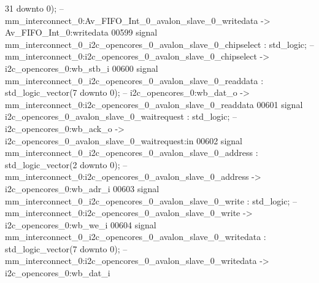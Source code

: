 \begin{DoxyCode}
{      31} \textcolor{keywordflow}{downto} \textcolor{vhdllogic}{}\textcolor{vhdllogic}{0}\textcolor{vhdlchar}{)};\textcolor{keyword}{ -- mm\_interconnect\_0:Av\_FIFO\_Int\_0\_avalon\_slave\_0\_writedata -> Av\_FIFO\_Int\_0:writedata}
00599     \textcolor{keywordflow}{signal} \textcolor{vhdlchar}{mm_interconnect_0_i2c_opencores_0_avalon_slave_0_chipselect}                 \textcolor{vhdlchar}{:} \textcolor{comment}{std\_logic};\textcolor{keyword}{        
                   -- mm\_interconnect\_0:i2c\_opencores\_0\_avalon\_slave\_0\_chipselect -> i2c\_opencores\_0:wb\_stb\_i}
00600     \textcolor{keywordflow}{signal} \textcolor{vhdlchar}{mm_interconnect_0_i2c_opencores_0_avalon_slave_0_readdata}                   \textcolor{vhdlchar}{:} \textcolor{comment}{std\_logic\_vector}\textcolor{vhdlchar}{(}\textcolor{vhdllogic}{}\textcolor{vhdllogic}{7}
       \textcolor{keywordflow}{downto} \textcolor{vhdllogic}{}\textcolor{vhdllogic}{0}\textcolor{vhdlchar}{)};\textcolor{keyword}{  -- i2c\_opencores\_0:wb\_dat\_o -> mm\_interconnect\_0:i2c\_opencores\_0\_avalon\_slave\_0\_readdata}
00601     \textcolor{keywordflow}{signal} \textcolor{vhdlchar}{i2c_opencores_0_avalon_slave_0_waitrequest}                                  \textcolor{vhdlchar}{:} \textcolor{comment}{std\_logic};\textcolor{keyword}{        
                   -- i2c\_opencores\_0:wb\_ack\_o -> i2c\_opencores\_0\_avalon\_slave\_0\_waitrequest:in}
00602     \textcolor{keywordflow}{signal} \textcolor{vhdlchar}{mm_interconnect_0_i2c_opencores_0_avalon_slave_0_address}                    \textcolor{vhdlchar}{:} \textcolor{comment}{std\_logic\_vector}\textcolor{vhdlchar}{(}\textcolor{vhdllogic}{}\textcolor{vhdllogic}{2}
       \textcolor{keywordflow}{downto} \textcolor{vhdllogic}{}\textcolor{vhdllogic}{0}\textcolor{vhdlchar}{)};\textcolor{keyword}{  -- mm\_interconnect\_0:i2c\_opencores\_0\_avalon\_slave\_0\_address -> i2c\_opencores\_0:wb\_adr\_i}
00603     \textcolor{keywordflow}{signal} \textcolor{vhdlchar}{mm_interconnect_0_i2c_opencores_0_avalon_slave_0_write}                      \textcolor{vhdlchar}{:} \textcolor{comment}{std\_logic};\textcolor{keyword}{        
                   -- mm\_interconnect\_0:i2c\_opencores\_0\_avalon\_slave\_0\_write -> i2c\_opencores\_0:wb\_we\_i}
00604     \textcolor{keywordflow}{signal} \textcolor{vhdlchar}{mm_interconnect_0_i2c_opencores_0_avalon_slave_0_writedata}                  \textcolor{vhdlchar}{:} \textcolor{comment}{std\_logic\_vector}\textcolor{vhdlchar}{(}\textcolor{vhdllogic}{}\textcolor{vhdllogic}{7}
       \textcolor{keywordflow}{downto} \textcolor{vhdllogic}{}\textcolor{vhdllogic}{0}\textcolor{vhdlchar}{)};\textcolor{keyword}{  -- mm\_interconnect\_0:i2c\_opencores\_0\_avalon\_slave\_0\_writedata -> i2c\_opencores\_0:wb\_dat\_i}

\end{DoxyCode}
